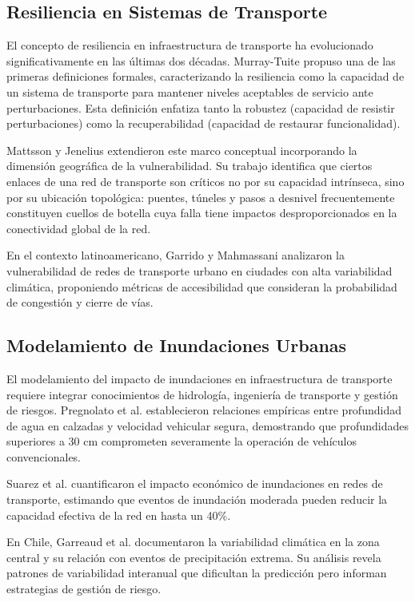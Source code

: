 \documentclass[conference]{IEEEtran}
\begin{document}
\subsection{Resiliencia en Sistemas de Transporte}

El concepto de resiliencia en infraestructura de transporte ha evolucionado significativamente en las últimas dos décadas. Murray-Tuite \citep{murray2006} propuso una de las primeras definiciones formales, caracterizando la resiliencia como la capacidad de un sistema de transporte para mantener niveles aceptables de servicio ante perturbaciones. Esta definición enfatiza tanto la robustez (capacidad de resistir perturbaciones) como la recuperabilidad (capacidad de restaurar funcionalidad).

Mattsson y Jenelius \citep{mattsson2015} extendieron este marco conceptual incorporando la dimensión geográfica de la vulnerabilidad. Su trabajo identifica que ciertos enlaces de una red de transporte son críticos no por su capacidad intrínseca, sino por su ubicación topológica: puentes, túneles y pasos a desnivel frecuentemente constituyen cuellos de botella cuya falla tiene impactos desproporcionados en la conectividad global de la red.

En el contexto latinoamericano, Garrido y Mahmassani \citep{garrido2000} analizaron la vulnerabilidad de redes de transporte urbano en ciudades con alta variabilidad climática, proponiendo métricas de accesibilidad que consideran la probabilidad de congestión y cierre de vías.

\subsection{Modelamiento de Inundaciones Urbanas}

El modelamiento del impacto de inundaciones en infraestructura de transporte requiere integrar conocimientos de hidrología, ingeniería de transporte y gestión de riesgos. Pregnolato et al. \citep{pregnolato2017} establecieron relaciones empíricas entre profundidad de agua en calzadas y velocidad vehicular segura, demostrando que profundidades superiores a 30 cm comprometen severamente la operación de vehículos convencionales.

Suarez et al. \citep{suarez2005} cuantificaron el impacto económico de inundaciones en redes de transporte, estimando que eventos de inundación moderada pueden reducir la capacidad efectiva de la red en hasta un 40\%.

En Chile, Garreaud et al. \citep{garreaud2017} documentaron la variabilidad climática en la zona central y su relación con eventos de precipitación extrema. Su análisis revela patrones de variabilidad interanual que dificultan la predicción pero informan estrategias de gestión de riesgo.
\end{document}
